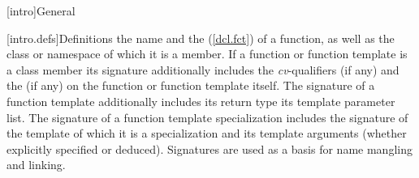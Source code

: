 \documentclass[american]{book}
\begin{document}

\renewcommand{\sectionmark}[1]{\markright{\thesection\hspace{1em}#1}}
\renewcommand{\chaptermark}[1]{\markboth{#1}{}}

[intro]{General}

\begin{paras}
\setcounter{section}{2}
[intro.defs]{Definitions}
\setcounter{Paras}{10}
%
{the name and the 
(\mbox{\ref{dcl.fct}}) of a function, as well as the class or namespace 
of which it is a member. If a function or function template is a class
member its signature additionally includes the
\mbox{\textit{cv}}-qualifiers (if any) and the
 (if any) on the function or function
template itself.
 The signature of a function template additionally
includes its return type\mbox{} its template parameter 
list\mbox{}.
The signature
of a function template specialization includes the signature of the
template of which it is a specialization and its template arguments
(whether explicitly specified or deduced). \mbox{\enternote}Signatures
are used as a basis for name mangling and linking.\mbox{\exitnote} }
\end{paras}
\end{document}
